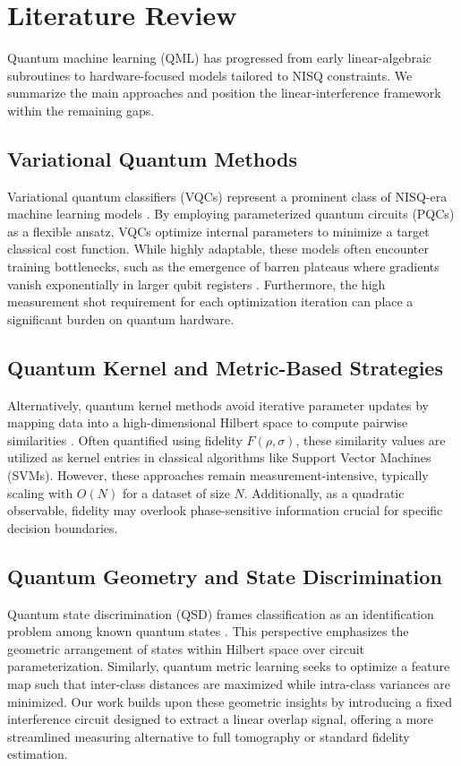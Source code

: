 \documentclass[conference]{IEEEtran}
\begin{document}
\section{Literature Review}

Quantum machine learning (QML) has progressed from early linear-algebraic subroutines to hardware-focused models tailored to NISQ constraints. We summarize the main approaches and position the linear-interference framework within the remaining gaps.

\subsection{Variational Quantum Methods}
Variational quantum classifiers (VQCs) represent a prominent class of NISQ-era machine learning models \cite{benedetti2019parameterized,abbas2021power}. By employing parameterized quantum circuits (PQCs) as a flexible ansatz, VQCs optimize internal parameters to minimize a target classical cost function. While highly adaptable, these models often encounter training bottlenecks, such as the emergence of barren plateaus where gradients vanish exponentially in larger qubit registers \cite{mcclean2018barren}. Furthermore, the high measurement shot requirement for each optimization iteration can place a significant burden on quantum hardware.

\subsection{Quantum Kernel and Metric-Based Strategies}
Alternatively, quantum kernel methods avoid iterative parameter updates by mapping data into a high-dimensional Hilbert space to compute pairwise similarities \cite{schuld2019feature,havlicek2019supervised}. Often quantified using fidelity $F(\rho, \sigma)$, these similarity values are utilized as kernel entries in classical algorithms like Support Vector Machines (SVMs). However, these approaches remain measurement-intensive, typically scaling with $O(N)$ for a dataset of size $N$. Additionally, as a quadratic observable, fidelity may overlook phase-sensitive information crucial for specific decision boundaries.

\subsection{Quantum Geometry and State Discrimination}
Quantum state discrimination (QSD) frames classification as an identification problem among known quantum states \cite{sergioli2019binary,gonzalez2021classification}. This perspective emphasizes the geometric arrangement of states within Hilbert space over circuit parameterization. Similarly, quantum metric learning seeks to optimize a feature map such that inter-class distances are maximized while intra-class variances are minimized. Our work builds upon these geometric insights by introducing a fixed interference circuit designed to extract a linear overlap signal, offering a more streamlined measuring alternative to full tomography or standard fidelity estimation.
\end{document}
